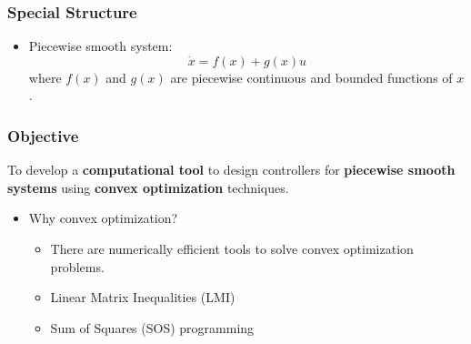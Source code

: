 \documentclass{beamer}
\newcommand{\green}{\color[rgb]{0,0.79,0}}
\newcommand{\beq}{\begin{equation*}}
\newcommand{\eeq}{\end{equation*}}
\begin{document}
  \frame
  {
    \frametitle{Special Structure}
		\begin{itemize}
		\item Piecewise smooth system: 
		\beq
		\dot x=f(x)+g(x)u 
		\eeq  
		where $f(x)$ and $g(x)$ are piecewise continuous and bounded functions of $x$. 
		\end{itemize}
		     \centerline{}
}
  \frame
  {
    \frametitle{Objective}
    To develop a \textbf{computational tool} to design controllers for \textbf{piecewise smooth systems} using \textbf{convex optimization} techniques.
    \begin{itemize}
    \item<2-> Why convex optimization? 
    \begin{itemize}
    \item There are numerically efficient tools to solve convex optimization problems.
    \item Linear Matrix Inequalities ({\green LMI})
    \item Sum of Squares ({\green SOS}) programming
    \end{itemize}
    \end{itemize}
  }
\end{document}
